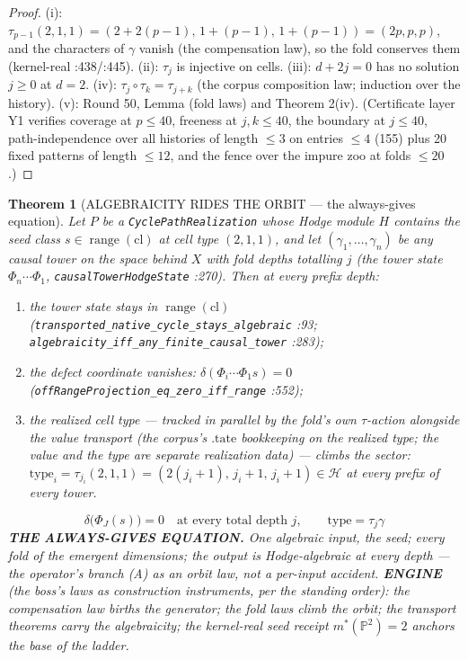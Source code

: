\documentclass[11pt]{article}
\newtheorem{theorem}{Theorem}[section]
\begin{document}
\begin{proof}
(i): $\tau_{p-1}(2,1,1)=(2+2(p-1),\,1+(p-1),\,1+(p-1))=(2p,p,p)$, and the characters of $\gamma$ vanish (the compensation law), so the fold conserves them (kernel-real :438/:445). (ii): $\tau_j$ is injective on cells. (iii): $d+2j=0$ has no solution $j\ge0$ at $d=2$. (iv): $\tau_j\circ\tau_k=\tau_{j+k}$ (the corpus composition law; induction over the history). (v): Round 50, Lemma (fold laws) and Theorem 2(iv). (Certificate layer Y1 verifies coverage at $p\le 40$, freeness at $j,k\le 40$, the boundary at $j\le 40$, path-independence over all histories of length $\le 3$ on entries $\le 4$ (155) plus 20 fixed patterns of length $\le 12$, and the fence over the impure zoo at folds $\le 20$.) \qedhere
\end{proof}

\begin{theorem}[ALGEBRAICITY RIDES THE ORBIT --- the always-gives equation]
\label{thm:rides}
Let $P$ be a \texttt{CyclePathRealization} whose Hodge module $H$ contains the seed class $s\in\operatorname{range}(\mathrm{cl})$ at cell type $(2,1,1)$, and let $(\gamma_1,\dots,\gamma_n)$ be any causal tower on the space behind $X$ with fold depths totalling $j$ (the tower state $\Phi_n\cdots\Phi_1$, \texttt{causalTowerHodgeState} :270). Then at every prefix depth:
\begin{enumerate}
\item[(i)] the tower state stays in $\operatorname{range}(\mathrm{cl})$ (\texttt{transported\_native\_cycle\_stays\_algebraic} :93; \texttt{algebraicity\_iff\_any\_finite\_causal\_tower} :283);
\item[(ii)] the defect coordinate vanishes: $\delta(\Phi_i\cdots\Phi_1 s)=0$ (\texttt{offRangeProjection\_eq\_zero\_iff\_range} :552);
\item[(iii)] the realized cell type --- tracked in parallel by the fold's own $\tau$-action alongside the value transport (the corpus's $\mathrm{.tate}$ bookkeeping on the realized type; the value and the type are separate realization data) --- climbs the sector: $\mathrm{type}_i=\tau_{j_i}(2,1,1)=(2(j_i{+}1),\,j_i{+}1,\,j_i{+}1)\in\mathcal H$ at every prefix of every tower.
\end{enumerate}
\[
\boxed{\;\delta\big(\Phi_J(s)\big)=0\quad\text{at every total depth } j,\qquad \mathrm{type}=\tau_j\gamma\;}
\]
\textbf{THE ALWAYS-GIVES EQUATION.} One algebraic input, the seed; every fold of the emergent dimensions; the output is Hodge-algebraic at every depth --- the operator's branch (A) as an orbit law, not a per-input accident. \textbf{ENGINE} (the boss's laws as construction instruments, per the standing order): the compensation law births the generator; the fold laws climb the orbit; the transport theorems carry the algebraicity; the kernel-real seed receipt $m^*(\mathbb P^2)=2$ anchors the base of the ladder.
\end{theorem}
\end{document}
